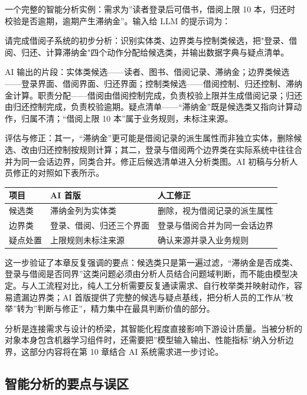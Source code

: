 \documentclass[
]{ctexbook}
\newenvironment{Shaded}{
  \ttfamily\small
}{}
\newcommand{\NormalTok}[1]{#1}
\newcounter{none}
\begin{document}
一个完整的智能分析实例：需求为''读者登录后可借书，借阅上限 10
本，归还时校验是否逾期，逾期产生滞纳金''。输入给 LLM 的提示词为：

\begin{Shaded}
\begin{Highlighting}[]
\NormalTok{请完成借阅子系统的初步分析：识别实体类、边界类与控制类候选，把"登录、借阅、归还、计算滞纳金"四个动作分配给候选类，并输出数据字典与疑点清单。}
\end{Highlighting}
\end{Shaded}

AI
输出的片段：实体类候选------读者、图书、借阅记录、滞纳金；边界类候选------登录界面、借阅界面、归还界面；控制类候选------借阅控制、归还控制、滞纳金计算。职责分配------借阅由借阅控制完成，负责校验上限并生成借阅记录；归还由归还控制完成，负责校验逾期。疑点清单------``滞纳金''既是候选类又指向计算动作，归属不清；``借阅上限
10 本''属于业务规则，未标注来源。

评估与修正：其一，``滞纳金''更可能是借阅记录的派生属性而非独立实体，删除候选、改由归还控制按规则计算；其二，登录与借阅两个边界类在实际系统中往往合并为同一会话边界，同类合并。修正后候选清单进入分析类图。AI
初稿与分析人员修正的对照如下表所示。

{\def\LTcaptype{none} %
\begin{longtable}[]{@{}lll@{}}
\toprule\noalign{}
项目 & AI 首版 & 人工修正 \\
\midrule\noalign{}
\endhead
\bottomrule\noalign{}
\endlastfoot
候选类 & 滞纳金列为实体类 & 删除，视为借阅记录的派生属性 \\
边界类 & 登录、借阅、归还三个界面 & 登录与借阅合并为同一会话边界 \\
疑点处置 & 上限规则未标注来源 & 确认来源并录入业务规则 \\
\end{longtable}
}

这一步验证了本章反复强调的要点：候选类只是第一遍过滤，``滞纳金是否成类、登录与借阅是否同界''这类问题必须由分析人员结合问题域判断，而不能由模型决定。与人工流程对比，纯人工分析需要反复通读需求、自行枚举类并映射动作，容易遗漏边界类；AI
首版提供了完整的候选与疑点基线，把分析人员的工作从''枚举''转为''判断与修正''，精力集中在最具判断价值的部分。

分析是连接需求与设计的桥梁，其智能化程度直接影响下游设计质量。当被分析的对象本身包含机器学习组件时，还需要把''模型输入输出、性能指标''纳入分析边界，这部分内容将在第
10 章结合 AI 系统需求进一步讨论。

\subsection{智能分析的要点与误区}\label{ux667aux80fdux5206ux6790ux7684ux8981ux70b9ux4e0eux8befux533a}
\end{document}
